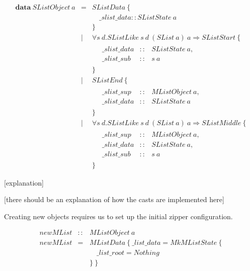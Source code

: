 \documentclass[runningheads,a4paper]{llncs}
\newcommand{\todo}[1]{[{\color{blue}#1}]}
\begin{document}
\begin{displaymath}
\begin{array}{lcl}
\mathbf{data}~\mathit{SListObject}~a & = & \mathit{SListData}~\{ \\ 
 & & \quad \_\mathit{slist}\_\mathit{data} :: \mathit{SListState}~a\\
 & & \} \\
 & \mid & \forall s~d.\mathit{SListLike}~s~d~(\mathit{SList}~a)~a \Rightarrow \mathit{SListStart}~\{\\
 & & \quad \begin{array}{lcl}
 \_\mathit{slist}\_\mathit{data} & :: & \mathit{SListState}~a, \\
 \_\mathit{slist}\_\mathit{sub}  & :: & s~a
 \end{array}\\
 & & \} \\
 & \mid & \mathit{SListEnd}~\{\\
  & & \quad \begin{array}{lcl}
  \_\mathit{slist}\_\mathit{sup}  & :: & \mathit{MListObject}~a, \\
  \_\mathit{slist}\_\mathit{data} & :: & \mathit{SListState}~a
  \end{array}\\
  & & \} \\
  & \mid & \forall s~d.\mathit{SListLike}~s~d~(\mathit{SList}~a)~a \Rightarrow \mathit{SListMiddle}~\{\\
   & & \quad \begin{array}{lcl}
   \_\mathit{slist}\_\mathit{sup}  & :: & \mathit{MListObject}~a, \\
   \_\mathit{slist}\_\mathit{data} & :: & \mathit{SListState}~a, \\
   \_\mathit{slist}\_\mathit{sub}  & :: & s~a
   \end{array}\\
   & & \}
\end{array}
\end{displaymath}

\todo{explanation}

\todo{there should be an explanation of how the casts are implemented here}

Creating new objects requires us to set up the initial zipper configuration.

\begin{displaymath}
\begin{array}{lcl}
\mathit{newMList} & :: & \mathit{MListObject}~a \\
\mathit{newMList} & = & \mathit{MListData}~\{~\_\mathit{list}\_\mathit{data} = \mathit{MkMListState}~\{\\ 
&& \quad \_\mathit{list}\_\mathit{root} = \mathit{Nothing}\\
&& \}~\}
\end{array}
\end{displaymath}
\end{document}
